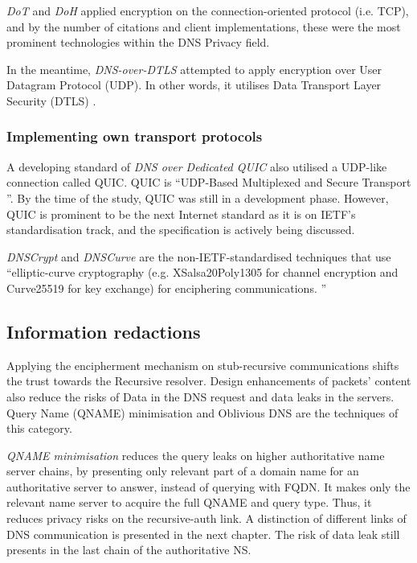 \textit{DoT} and \textit{DoH} applied encryption on the connection-oriented protocol (i.e. TCP), and by the number of citations and client implementations, these were the most prominent technologies within the DNS Privacy field.

In the meantime, \textit{DNS-over-DTLS} attempted to apply encryption over User Datagram Protocol (UDP). In other words, it utilises Data Transport Layer Security (DTLS) \cite{rfc4347}.

\subsubsection{Implementing own transport protocols}
A developing standard of \textit{DNS over Dedicated QUIC} \cite{dnsoquic} also utilised a UDP-like connection called QUIC.
QUIC is ``UDP-Based Multiplexed and Secure Transport \cite{ietf-quic-transport-20}''.
By the time of the study, QUIC was still in a development phase. However, QUIC is prominent to be the next Internet standard as it is on IETF's standardisation track, and the specification is actively being discussed.

\textit{DNSCrypt} \cite{denis2015dnscrypt} and \textit{DNSCurve} \cite{dempsky2010dnscurve} are the non-IETF-standardised techniques that use ``elliptic-curve cryptography (e.g. XSalsa20Poly1305 \cite{chacha} for channel encryption and Curve25519 for key exchange) for enciphering communications. \cite{van2018privacy}''

\subsection{Information redactions}
Applying the encipherment mechanism on stub-recursive communications shifts the trust towards the Recursive resolver.
Design enhancements of packets' content also reduce the risks of Data in the DNS request and data leaks in the servers.
Query Name (QNAME) minimisation \cite{bortzmeyer2016dns} and Oblivious DNS \cite{annee-dprive-oblivious-dns-00} are the techniques of this category.

\textit{QNAME minimisation} reduces the query leaks on higher authoritative name server chains, by presenting only relevant part of a domain name for an authoritative server to answer, instead of querying with FQDN.
It makes only the relevant name server to acquire the full QNAME and query type. Thus, it reduces privacy risks on the recursive-auth link.
A distinction of different links of DNS communication is presented in the next chapter.
The risk of data leak still presents in the last chain of the authoritative NS.

